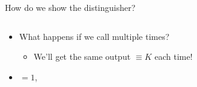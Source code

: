 \documentclass[aspectratio=169, lualatex, handout]{beamer}
\begin{document}
\begin{frame}{How do we show the distinguisher?}
	\begin{columns}[c]
		\begin{column}{0.4\textwidth}
			\begin{itemize}[<+->]
				\item What happens if we call \prog{}\link{} multiple times?
				      \begin{itemize}
					      \item We'll get the same output $\equiv K$ each time!
				      \end{itemize}
				\item {} $= 1$,
			\end{itemize}
		\end{column}
		\begin{column}{0.6\textwidth}
			\begin{flushright}
			\end{flushright}
		\end{column}
	\end{columns}
\end{frame}
\end{document}
